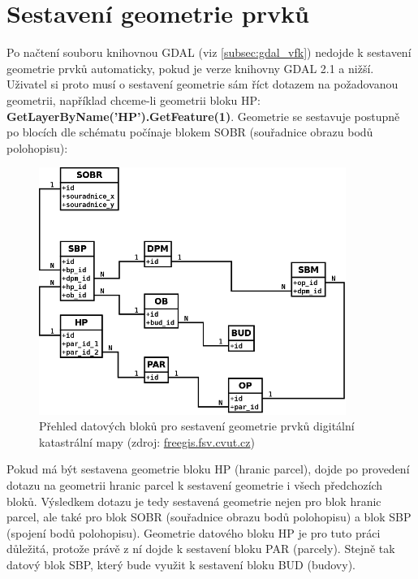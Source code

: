 \section{Sestavení geometrie prvků}
\label{sec:sestaveni_geometrie}
Po načtení  souboru knihovnou GDAL (viz \ref{subsec:gdal_vfk})
nedojde k sestavení geometrie prvků automaticky, pokud je verze
knihovny GDAL 2.1 a nižší. Uživatel si proto musí o sestavení
geometrie sám říct dotazem na požadovanou geometrii, například
chceme-li geometrii bloku HP:
\textbf{GetLayerByName('HP').GetFeature(1)}. Geo\-metrie se sestavuje
postupně po blocích dle schématu počínaje blokem SOBR (souřadnice
obrazu bodů polohopisu):
\begin{figure}[H]
	 \centering
      \includegraphics[width=10cm]{./pictures/Vfk-diagram-geom.png}
      \caption{Přehled datových bloků pro sestavení geometrie prvků digitální katastrální mapy (zdroj:
      \href{http://freegis.fsv.cvut.cz/wiki/images/thumb/8/8a/Vfk-diagram-geom.png/744px-Vfk-diagram-geom.png}{freegis.fsv.cvut.cz})}
      \label{fig:vfk_diagram_geom}
\end{figure}
Pokud má být sestavena geometrie bloku HP (hranic parcel), dojde po
provedení dotazu na geometrii hranic parcel k sestavení geometrie i
všech předchozích bloků. Výsledkem dotazu je tedy sestavená geometrie
nejen pro blok hranic parcel, ale také pro blok SOBR (souřadnice
obrazu bodů polohopisu) a blok SBP (spojení bodů
polohopisu). Geometrie datového bloku HP je pro tuto práci důležitá,
protože právě z ní dojde k sestavení bloku PAR (parcely). Stejně tak
datový blok SBP, který bude využit k sestavení bloku BUD (budovy).
